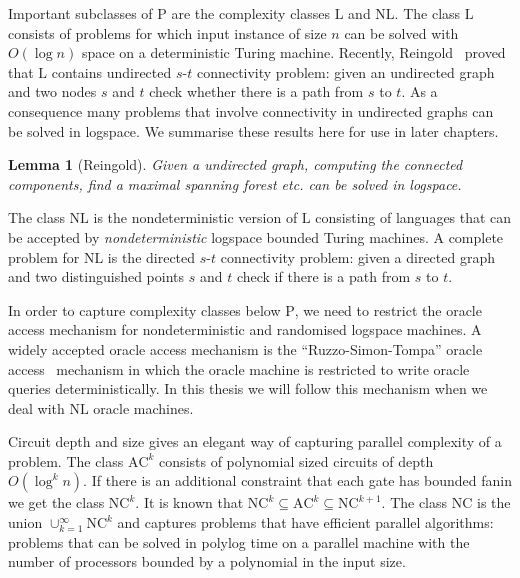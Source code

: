 \documentclass[11pt]{madras}%
\newtheorem{lemma}[theorem]{Lemma}
\theoremstyle{remark}
\begin{document}
Important subclasses of $\mathrm{P}$ are the complexity classes
$\mathrm{L}$ and $\mathrm{NL}$. The class $\mathrm{L}$ consists of
problems for which input instance of size $n$ can be solved with
$O(\log{n})$ space on a deterministic Turing machine. Recently,
Reingold~\cite{reingold2005undirected} proved that $\mathrm{L}$
contains undirected $s$-$t$ connectivity problem: given an undirected
graph and two nodes $s$ and $t$ check whether there is a path from $s$
to $t$.  As a consequence many problems that involve connectivity in
undirected graphs can be solved in logspace.  We summarise these
results here for use in later chapters.

\begin{lemma}[Reingold]\label{lem-connectivity}
  Given a undirected graph, computing the connected components, find a
  maximal spanning forest etc. can be solved in logspace.
\end{lemma}

The class $\mathrm{NL}$ is the nondeterministic version of
$\mathrm{L}$ consisting of languages that can be accepted by
\emph{nondeterministic} logspace bounded Turing machines. A complete
problem for $\mathrm{NL}$ is the directed $s$-$t$ connectivity
problem: given a directed graph and two distinguished points $s$ and
$t$ check if there is a path from $s$ to $t$.


In order to capture complexity classes below $\mathrm{P}$, we need to
restrict the oracle access mechanism for nondeterministic and
randomised logspace machines. A widely accepted oracle access
mechanism is the ``Ruzzo-Simon-Tompa'' oracle
access~\cite{ruzzo84spacebounded} mechanism in which the oracle
machine is restricted to write oracle queries deterministically. In
this thesis we will follow this mechanism when we deal with
$\mathrm{NL}$ oracle machines.

Circuit depth and size gives an elegant way of capturing parallel
complexity of a problem.  The class $\mathrm{AC}^k$ consists of
polynomial sized circuits of depth $O(\log^k{n})$.  If there is an
additional constraint that each gate has bounded fanin we get the
class $\mathrm{NC}^k$. It is known that $\mathrm{NC}^k \subseteq
\mathrm{AC}^k \subseteq\mathrm{NC}^{k+1}$.  The class $\mathrm{NC}$ is
the union $\cup_{k=1}^\infty \mathrm{NC}^k$ and captures problems that
have efficient parallel algorithms: problems that can be solved in
polylog time on a parallel machine with the number of processors
bounded by a polynomial in the input size.

%
\end{document}
